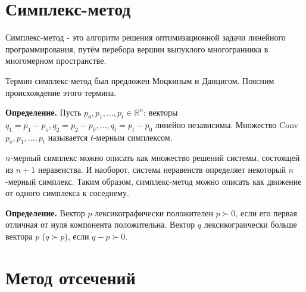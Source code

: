 \documentclass[a4paper,14pt,russian]{extreport}
\begin{document}
\section{Симплекс-метод}

Симплекс-метод - это алгоритм решения оптимизационной задачи линейного программирования, путём перебора вершин выпуклого многогранника в многомерном пространстве.
\par
Термин симплекс-метод был предложен Моцкиным и Данцигом\cite{dantzig}. Поясним происхождение этого термина. 
\par
{\bf Определение.} Пусть $p_0,p_1,...,p_t \in \mathbb{R}^n$: векторы $q_1=p_1-p_o,q_2=p_2-p_0,...,q_t=p_t-p_0$ линейно независимы. Множество Conv{$p_o,p_1,...,p_t$} называется $t$-мерным симплексом. 
\par 
$n$-мерный симплекс можно описать как множество решений системы, состоящей из $n+1$ неравенства. И наоборот, система неравенств определяет некоторый $n$-мерный симплекс. Таким образом, симплекс-метод можно описать как движение от одного симплекса к соседнему. 
\par
{\bf Определение.} Вектор $p$ лексикографически положителен $p \succ 0$, если его первая отличная от нуля компонента положительна. Вектор $q$ лексикограически больше вектора $p$ ($q \succ p$), если $q-p \succ 0$.

\section{Метод отсечений}
\end{document}
